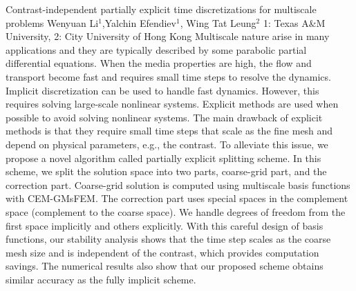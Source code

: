 \begin{addmargin}[2em]{0em}
\vspace{1.5ex}
\abs
{Contrast-independent partially explicit time discretizations for multiscale problems}
{Wenyuan Li$^{1}$,Yalchin Efendiev$^{1}$, Wing Tat Leung$^{2}$}
{1: Texas A\&M University, 2: City University of Hong Kong}
{Multiscale nature arise in many applications and they are typically described by some parabolic partial differential equations. When the media properties are high, the flow and transport become fast and requires small time steps to resolve the dynamics. Implicit
discretization
can be used to handle fast dynamics. However, this requires
solving large-scale nonlinear systems. Explicit methods
are used when possible to avoid solving nonlinear systems.
 The main drawback of explicit methods is that they
require small time steps that scale as the fine mesh and depend
on physical parameters, e.g., the contrast. To alleviate this issue,
we propose
a novel algorithm called partially explicit splitting scheme. In this scheme, we split the solution space into two parts, coarse-grid
part, and the correction part. Coarse-grid solution is computed using
multiscale basis functions with CEM-GMsFEM. The correction part
uses special spaces in the complement space (complement to the coarse space). We handle degrees of freedom from the first space implicitly and others explicitly. With this careful design of basis functions, our stability analysis shows that the time step scales as the coarse mesh size and is independent of the contrast, which provides computation savings. The numerical results also show that our proposed scheme obtains similar accuracy as the fully implicit scheme.}



\end{addmargin}
